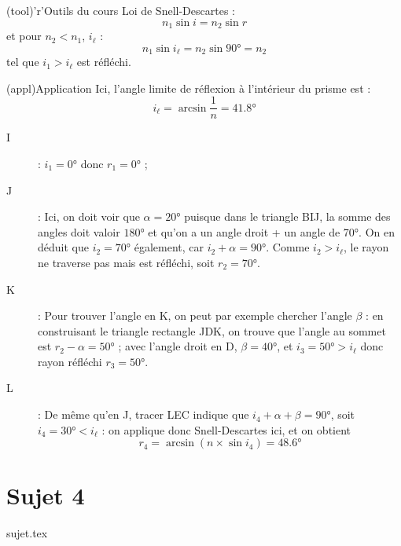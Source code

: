 \documentclass[a4paper, 11pt, oneside]{book}
\begin{document}
{\begin{tcbraster}[raster columns=3, raster equal height=rows]
\begin{tcolorbox}[blankest, raster multicolumn=1, space to=\myspace]
\begin{tcbraster}[raster columns=1]
				\begin{tcb}(tool)'r'{Outils du cours}
					Loi de Snell-Descartes :
					\[ n_1\sin i = n_2\sin r\]
					et pour $n_2 < n_1$, $i_\ell$ :
					\[ n_1\sin i_\ell = n_2\sin \ang{90;;} = n_2\]
					tel que $i_1 > i_\ell$ est réfléchi.
				\end{tcb}
			\end{tcbraster}
		\end{tcolorbox}
	\end{tcbraster}
	\begin{tcb}[sidebyside](appl){Application}
		Ici, l'angle limite de réflexion à l'intérieur du prisme est : \[i_\ell =
			\arcsin \frac{1}{n} = \boxed{ \ang{41.8;;}}\]
		\begin{description}
			\item[I] : $\boxed{i_1 = \ang{0;;}}$ donc
				$\boxed{r_1 = \ang{0;;}}$ ;
			\item[J] : Ici, on doit voir que $\alpha = \ang{20;;}$ puisque
				dans le triangle BIJ, la somme des angles doit valoir $\ang{180;;}$
				et qu'on a un angle droit + un angle de \ang{70;;}.
				On en déduit que $\boxed{i_2 = \ang{70;;}}$ également, car
				$i_2 + \alpha = \ang{90;;}$.\smallbreak
				Comme \underline{$i_2 > i_\ell$}, le rayon ne traverse pas mais est
				réfléchi, soit $\boxed{r_2 = \ang{70;;}}$.
		\end{description}
		\tcblower
		\begin{description}
			\item[K] : Pour trouver l'angle en K, on peut par exemple chercher
				l'angle $\beta$ : en construisant le triangle rectangle JDK, on
				trouve que l'angle au sommet est $r_2 - \alpha = \ang{50;;}$ ;
				avec l'angle droit en D, $\beta = \ang{40;;}$, et $\boxed{i_3
						= \ang{50;;} > i_\ell}$ donc rayon réfléchi $\boxed{r_3 =
						\ang{50;;}}$.
			\item[L] : De même qu'en J, tracer LEC indique que $i_4 + \alpha + \beta
					= \ang{90;;}$, soit $\boxed{i_4 = \ang{30;;} < i_\ell}$
				: on applique donc Snell-Descartes ici, et on obtient
				\[\boxed{r_4} = \arcsin (n\times \sin i_4) =
					\boxed{\ang{48.6;;}}\]
		\end{description}
	\end{tcb}

}

\resetQ
\newpage

\chapter{Sujet 4}
{sujet.tex}
\end{document}

